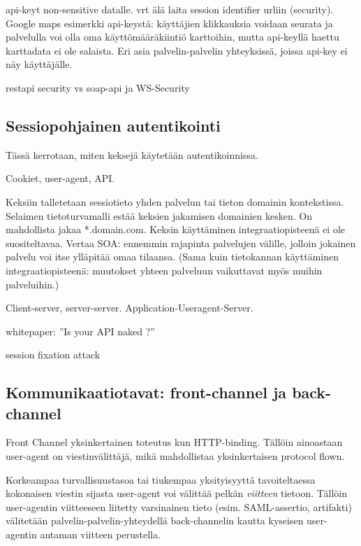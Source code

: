 \documentclass[finnish,gradu]{tktltiki}
\begin{document}
  api-keyt non-sensitive datalle. vrt älä laita session identifier urliin (security). Google maps esimerkki api-keystä: käyttäjien klikkauksia voidaan seurata ja palvelulla voi olla oma käyttömääräkiintiö karttoihin, mutta api-keyllä haettu karttadata ei ole salaista. Eri asia palvelin-palvelin yhteyksissä, joissa api-key ei näy käyttäjälle.

  restapi security vs soap-api ja WS-Security


  \subsection{Sessiopohjainen autentikointi} %
  \label{sub:sessiopohjainen_autentikointi}
  Tässä kerrotaan, miten keksejä käytetään autentikoinnissa.

  Cookiet, user-agent, API.

  Keksiin talletetaan sessiotieto yhden palvelun tai tieton domainin kontekstissa.
  Selaimen tietoturvamalli estää keksien jakamisen domainien kesken. On mahdollista jakaa *.domain.com.
  Keksin käyttäminen integraatiopisteenä ei ole suositeltavaa. Vertaa SOA: ennemmin rajapinta palvelujen välille, jolloin jokainen palvelu voi itse ylläpitää omaa tilaansa. (Sama kuin tietokannan käyttäminen integraatiopisteenä: muutokset yhteen palveluun vaikuttavat myös muihin palveluihin.)

  Client-server, server-server. Application-Useragent-Server.

  whitepaper: ''Is your API naked ?''

  session fixation attack %



  \subsection{Kommunikaatiotavat: front-channel ja back-channel} %
  \label{sub:kommunikaatiotavat_front_channel_ja_back_channel}

  Front Channel yksinkertainen toteutus kun HTTP-binding. Tällöin ainoastaan user-agent on viestinvälittäjä, mikä mahdollistaa yksinkertaisen protocol flown.

  Korkeampaa turvallisuustasoa tai tiukempaa yksityisyyttä tavoiteltaessa kokonaisen viestin sijasta user-agent voi välittää pelkän \emph{viitteen} tietoon. Tällöin user-agentin viitteeseen liitetty varsinainen tieto (esim. SAML-assertio, artifakti) välitetään palvelin-palvelin-yhteydellä back-channelin kautta kyseisen user-agentin antaman viitteen perustella.
\end{document}
